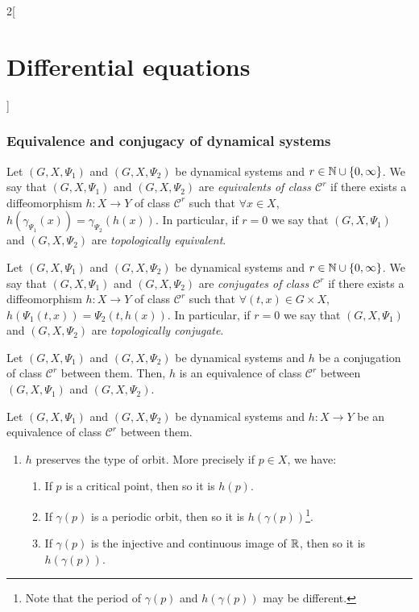 \documentclass[../../../main.tex]{subfiles}
\begin{document}
\begin{multicols}{2}[\section{Differential equations}]
  \subsubsection{Equivalence and conjugacy of dynamical systems}
  \begin{definition}
    Let $(G,X,\Psi_1)$ and $(G,X,\Psi_2)$ be dynamical systems and $r\in\mathbb{N}\cup\{0,\infty\}$. We say that $(G,X,\Psi_1)$ and $(G,X,\Psi_2)$ are \textit{equivalents of class $\mathcal{C}^r$} if there exists a diffeomorphism $h:X\rightarrow Y$ of class $\mathcal{C}^r$ such that $\forall x\in X$, $h(\gamma_{\Psi_1}(x))=\gamma_{\Psi_2}(h(x))$. In particular, if $r=0$ we say that $(G,X,\Psi_1)$ and $(G,X,\Psi_2)$ are \textit{topologically equivalent}.
  \end{definition}
  \begin{definition}
    Let $(G,X,\Psi_1)$ and $(G,X,\Psi_2)$ be dynamical systems and $r\in\mathbb{N}\cup\{0,\infty\}$. We say that $(G,X,\Psi_1)$ and $(G,X,\Psi_2)$ are \textit{conjugates of class $\mathcal{C}^r$} if there exists a diffeomorphism $h:X\rightarrow Y$ of class $\mathcal{C}^r$ such that $\forall (t,x)\in G\times X$, $h(\Psi_1(t,x))=\Psi_2(t,h(x))$. In particular, if $r=0$ we say that $(G,X,\Psi_1)$ and $(G,X,\Psi_2)$ are \textit{topologically conjugate}.
  \end{definition}
  \begin{prop}
    Let $(G,X,\Psi_1)$ and $(G,X,\Psi_2)$ be dynamical systems and $h$ be a conjugation of class $\mathcal{C}^r$ between them. Then, $h$ is an equivalence of class $\mathcal{C}^r$ between $(G,X,\Psi_1)$ and $(G,X,\Psi_2)$.
  \end{prop}
  \begin{prop}
    Let $(G,X,\Psi_1)$ and $(G,X,\Psi_2)$ be dynamical systems and $h:X\rightarrow Y$ be an equivalence of class $\mathcal{C}^r$ between them.
    \begin{enumerate}
      \item $h$ preserves the type of orbit. More precisely if $p\in X$, we have:
            \begin{enumerate}
              \item If $p$ is a critical point, then so it is $h(p)$.
              \item If $\gamma(p)$ is a periodic orbit, then so it is $h(\gamma(p))$\footnote{Note that the period of $\gamma(p)$ and $h(\gamma(p))$ may be different.}.
              \item If $\gamma(p)$ is the injective and continuous image of $\mathbb{R}$, then so it is $h(\gamma(p))$.

\end{enumerate}
\end{enumerate}
\end{prop}
\end{multicols}
\end{document}
